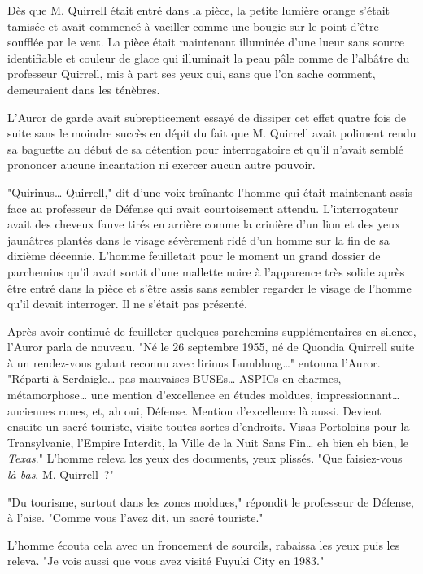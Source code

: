 Dès que M. Quirrell était entré dans la pièce, la petite lumière orange s'était tamisée et avait commencé à vaciller comme une bougie sur le point d'être soufflée par le vent. La pièce était maintenant illuminée d'une lueur sans source identifiable et couleur de glace qui illuminait la peau pâle comme de l'albâtre du professeur Quirrell, mis à part ses yeux qui, sans que l'on sache comment, demeuraient dans les ténèbres.

L'Auror de garde avait subrepticement essayé de dissiper cet effet quatre fois de suite sans le moindre succès en dépit du fait que M. Quirrell avait poliment rendu sa baguette au début de sa détention pour interrogatoire et qu'il n'avait semblé prononcer aucune incantation ni exercer aucun autre pouvoir.

"Quirinus… Quirrell," dit d'une voix traînante l'homme qui était maintenant assis face au professeur de Défense qui avait courtoisement attendu. L'interrogateur avait des cheveux fauve tirés en arrière comme la crinière d'un lion et des yeux jaunâtres plantés dans le visage sévèrement ridé d'un homme sur la fin de sa dixième décennie. L'homme feuilletait pour le moment un grand dossier de parchemins qu'il avait sortit d'une mallette noire à l'apparence très solide après être entré dans la pièce et s'être assis sans sembler regarder le visage de l'homme qu'il devait interroger. Il ne s'était pas présenté.

Après avoir continué de feuilleter quelques parchemins supplémentaires en silence, l'Auror parla de nouveau. "Né le 26 septembre 1955, né de Quondia Quirrell suite à un rendez-vous galant reconnu avec lirinus Lumblung…" entonna l'Auror. "Réparti à Serdaigle… pas mauvaises BUSEs… ASPICs en charmes, métamorphose… une mention d'excellence en études moldues, impressionnant… anciennes runes, et, ah oui, Défense. Mention d'excellence là aussi. Devient ensuite un sacré touriste, visite toutes sortes d'endroits. Visas Portoloins pour la Transylvanie, l'Empire Interdit, la Ville de la Nuit Sans Fin… eh bien eh bien, le \emph{Texas}." L'homme releva les yeux des documents, yeux plissés. "Que faisiez-vous \emph{là-bas}, M. Quirrell~?"

"Du tourisme, surtout dans les zones moldues," répondit le professeur de Défense, à l'aise. "Comme vous l'avez dit, un sacré touriste."

L'homme écouta cela avec un froncement de sourcils, rabaissa les yeux puis les releva. "Je vois aussi que vous avez visité Fuyuki City en 1983."

